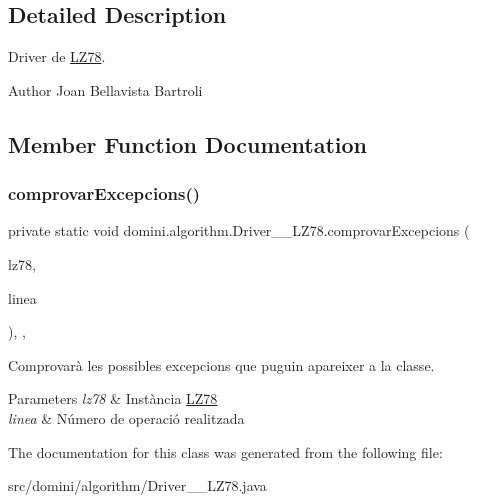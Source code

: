 \subsection{Detailed Description}
Driver de \hyperlink{classdomini_1_1algorithm_1_1LZ78}{L\+Z78}. 

\begin{DoxyAuthor}{Author}
Joan Bellavista Bartroli 
\end{DoxyAuthor}


\subsection{Member Function Documentation}
\mbox{\label{classdomini_1_1algorithm_1_1Driver____LZ78_a21b185a3310ced322a1eb1b49f889f15}} 
\subsubsection{\texorpdfstring{comprovar\+Excepcions()}{comprovarExcepcions()}}
{\footnotesize\ttfamily private static void domini.\+algorithm.\+Driver\+\_\+\+\_\+\+L\+Z78.\+comprovar\+Excepcions (\begin{DoxyParamCaption}\item[{\hyperlink{classdomini_1_1algorithm_1_1LZ78}{L\+Z78}}]{lz78,  }\item[{String}]{linea }\end{DoxyParamCaption})\hspace{0.3cm}{\ttfamily [inline]}, {\ttfamily [static]}, {\ttfamily [private]}}



Comprovarà les possibles excepcions que puguin apareixer a la classe. 


\begin{DoxyParams}{Parameters}
{\em lz78} & Instància \hyperlink{classdomini_1_1algorithm_1_1LZ78}{L\+Z78} \\
\hline
{\em linea} & Número de operació realitzada \\
\hline
\end{DoxyParams}


The documentation for this class was generated from the following file\+:\begin{DoxyCompactItemize}
\item 
src/domini/algorithm/Driver\+\_\+\+\_\+\+L\+Z78.\+java\end{DoxyCompactItemize}
